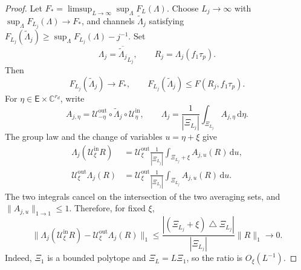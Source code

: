 \documentclass[11pt]{article}
\theoremstyle{remark}
\theoremstyle{plain}
\newcommand{\dd}{\mathrm d}
\begin{document}
\begin{proof}
Let \(F_*=\limsup_{L\to\infty}\sup_\Lambda F_L(\Lambda)\).  Choose
\(L_j\to\infty\) with \(\sup_\Lambda F_{L_j}(\Lambda)\to F_*\), and channels
\(\widetilde\Lambda_j\) satisfying
\(F_{L_j}(\widetilde\Lambda_j)\ge\sup_\Lambda F_{L_j}(\Lambda)-j^{-1}\).
Set
\[
  \Lambda_j=\overline{\widetilde\Lambda_j}_{L_j},
  \qquad R_j=\Lambda_j(f_1\tau_p).
\]
Then
\begin{equation}\label{eq:unified-maximizing-sequence}
  F_{L_j}(\widetilde\Lambda_j)\longrightarrow F_*,
  \qquad
  F_{L_j}(\widetilde\Lambda_j)\le F(R_j,f_1\tau_p).
\end{equation}
For \(\eta\in\mathsf E\times\mathbb C^{r_d}\), write
\[
  A_{j,\eta}
  =\mathcal U_{-\eta}^{\mathrm{out}}\circ
   \widetilde\Lambda_j\circ\mathcal U_\eta^{\mathrm{in}},
  \qquad
  \Lambda_j=\frac1{|\Xi_{L_j}|}\int_{\Xi_{L_j}}A_{j,\eta}\,\dd\eta.
\]
The group law and the change of variables \(u=\eta+\xi\) give
\[
\begin{aligned}
  \Lambda_j(\mathcal U_\xi^{\mathrm{in}}R)
  &=\mathcal U_\xi^{\mathrm{out}}
    \frac1{|\Xi_{L_j}|}\int_{\Xi_{L_j}+\xi}A_{j,u}(R)\,\dd u,\\
  \mathcal U_\xi^{\mathrm{out}}\Lambda_j(R)
  &=\mathcal U_\xi^{\mathrm{out}}
    \frac1{|\Xi_{L_j}|}\int_{\Xi_{L_j}}A_{j,u}(R)\,\dd u.
\end{aligned}
\]
The two integrals cancel on the intersection of the two averaging sets,
and \(\|A_{j,u}\|_{1\to1}\le1\).  Therefore, for fixed \(\xi\),
\begin{equation}\label{eq:unified-approx-covariance}
  \|\Lambda_j(\mathcal U_\xi^{\mathrm{in}}R)
    -\mathcal U_\xi^{\mathrm{out}}\Lambda_j(R)\|_1
  \le
  \frac{|(\Xi_{L_j}+\xi)\mathbin\triangle\Xi_{L_j}|}{|\Xi_{L_j}|}
  \|R\|_1
  \longrightarrow0.
\end{equation}
Indeed, \(\Xi_1\) is a bounded polytope and \(\Xi_L=L\Xi_1\), so the
ratio is \(O_\xi(L^{-1})\).


\end{proof}
\end{document}
